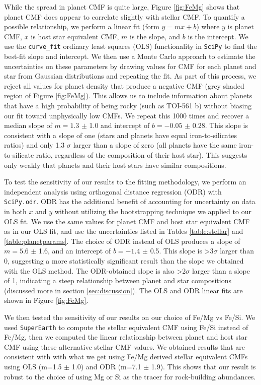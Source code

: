 \documentclass[twocolumn]{aastex631}
\begin{document}
While the spread in planet CMF is quite large, Figure \ref{fig:FeMg} shows that planet CMF does appear to correlate slightly with stellar CMF. To quantify a possible relationship, we perform a linear fit (form $y=mx+b$) where $y$ is planet CMF, $x$ is host star equivalent CMF, $m$ is the slope, and $b$ is the intercept. We use the \texttt{curve\_fit} ordinary least squares (OLS) functionality in {\tt SciPy} to find the best-fit slope and intercept. We then use a Monte Carlo approach to estimate the uncertainties on these parameters by drawing values for CMF for each planet and star from Gaussian distributions and repeating the fit. As part of this process, we reject all values for planet density that produce a negative CMF (grey shaded region of Figure \ref{fig:FeMg}). This allows us to include information about planets that have a high probability of being rocky (such as TOI-561 b) without biasing our fit toward unphysically low CMFs. We repeat this 1000 times and recover a median slope of $m=1.3$ $\pm$ 1.0 and intercept of $b=-0.05$ $\pm$ 0.28. This slope is consistent with a slope of one (stars and planets have equal iron-to-silicates ratios) and only 1.3 $\sigma$ larger than a slope of zero (all planets have the same iron-to-silicate ratio, regardless of the composition of their host star). This suggests only weakly that planets and their host stars have similar compositions.  

To test the sensitivity of our results to the fitting methodology, we perform an independent analysis using orthogonal distance regression (ODR) with {\tt SciPy.odr}. ODR has the additional benefit of accounting for uncertainty on data in both $x$ and $y$ without utilizing the bootstrapping technique we applied to our OLS fit. We use the same values for planet CMF and host star equivalent CMF as in our OLS fit, and use the uncertainties listed in Tables \ref{table:stellar} and \ref{table:planetparams}. The choice of ODR instead of OLS produces a slope of $m=5.6$ $\pm$ 1.6, and an intercept of $b=-1.4$ $\pm$ 0.5. This slope is >3$\sigma$ larger than 0, suggesting a more statistically significant result than the slope we obtained with the OLS method. The ODR-obtained slope is also >2$\sigma$ larger than a slope of 1, indicating a steep relationship between planet and star compositions (discussed more in section \ref{sec:discussion}). The OLS and ODR linear fits are shown in Figure \ref{fig:FeMg}. 

We then tested the sensitivity of our results on our choice of Fe/Mg vs Fe/Si. We used \texttt{SuperEarth} to compute the stellar equivalent CMF using Fe/Si instead of Fe/Mg, then we computed the linear relationship between planet and host star CMF using these alternative stellar CMF values. We obtained results that are consistent with with what we get using Fe/Mg derived stellar equivalent CMFs using OLS (m=1.5 $\pm$ 1.0) and ODR (m=7.1 $\pm$ 1.9). This shows that our result is robust to the choice of using Mg or Si as the tracer for rock-building abundances. 
\end{document}
